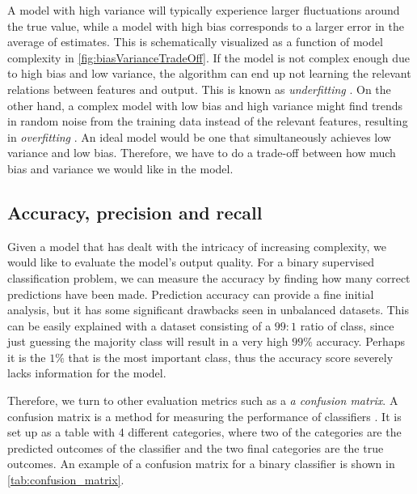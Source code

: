 

A model with high variance will typically experience larger fluctuations around the true value, while a model with high bias corresponds to a larger error in the average of estimates. This is schematically visualized as a function of model complexity in  \autoref{fig:biasVarianceTradeOff}. If the model is not complex enough due to high bias and low variance, the algorithm can end up not learning the relevant relations between features and output. This is known as \textit{underfitting} \cite{Murphy2012}. On the other hand, a complex model with low bias and high variance might find trends in random noise from the training data instead of the relevant features, resulting in \textit{overfitting} \cite{Murphy2012}. An ideal model would be one that simultaneously achieves low variance and low bias.  Therefore, we have to do a trade-off between how much bias and variance we would like in the model.

\subsection{Accuracy, precision and recall}

Given a model that has dealt with the intricacy of increasing complexity, we would like to evaluate the model's output quality. For a binary supervised classification problem, we can measure the accuracy by finding how many correct predictions have been made. Prediction accuracy can provide a fine initial analysis, but it has some significant drawbacks seen in unbalanced datasets. This can be easily explained with a dataset consisting of a $99:1$ ratio of class, since just guessing the majority class will result in a very high $99\%$ accuracy. Perhaps it is the $1\%$ that is the most important class, thus the accuracy score severely lacks information for the model.

Therefore, we turn to other evaluation metrics such as a \textit{a confusion matrix}. A confusion matrix is a method for measuring the performance of classifiers \cite{Murphy2012}. It is set up as a table with 4 different categories, where two of the categories are the predicted outcomes of the classifier and the two final categories are the true outcomes. An example of a confusion matrix for a binary classifier is shown in \autoref{tab:confusion_matrix}.

